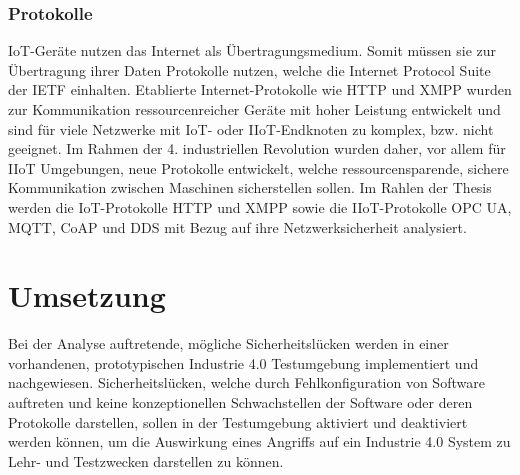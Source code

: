 \subsubsection{Protokolle}
\ac{IoT}-Geräte nutzen das Internet als Übertragungsmedium. Somit müssen sie zur Übertragung ihrer Daten Protokolle nutzen, welche die Internet Protocol Suite der \ac{IETF} einhalten. Etablierte Internet-Protokolle wie HTTP und XMPP wurden zur Kommunikation ressourcenreicher Geräte mit hoher Leistung entwickelt und sind für viele Netzwerke mit \ac{IoT}- oder \ac{IIoT}-Endknoten zu komplex, bzw. nicht geeignet. Im Rahmen der 4. industriellen Revolution wurden daher, vor allem für \ac{IIoT} Umgebungen, neue Protokolle entwickelt, welche ressourcensparende, sichere Kommunikation zwischen Maschinen sicherstellen sollen. Im Rahlen der Thesis werden die \ac{IoT}-Protokolle HTTP und XMPP sowie die \ac{IIoT}-Protokolle OPC UA, MQTT, CoAP und DDS mit Bezug auf ihre Netzwerksicherheit analysiert.

\section{Umsetzung}
Bei der Analyse auftretende, mögliche Sicherheitslücken werden in einer vorhandenen, prototypischen Industrie 4.0 Testumgebung implementiert und nachgewiesen. Sicherheitslücken, welche durch Fehlkonfiguration von Software auftreten und keine konzeptionellen Schwachstellen der Software oder deren Protokolle darstellen, sollen in der Testumgebung aktiviert und deaktiviert werden können, um die Auswirkung eines Angriffs auf ein Industrie 4.0 System zu Lehr- und Testzwecken darstellen zu können.